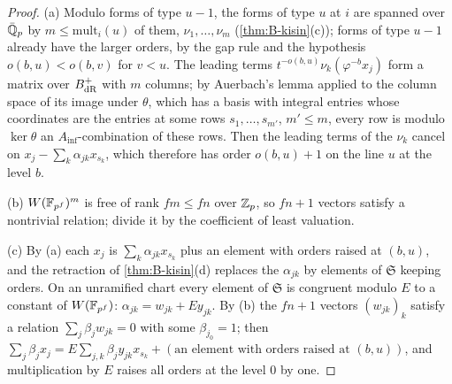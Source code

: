 \begin{proof}
(a) Modulo forms of type $u-1$, the forms of type $u$ at $i$ are spanned over $\bar{\mathbb{Q}}_p$ by $m\le\mathrm{mult}_i(u)$ of them, $\nu_1,\dots,\nu_m$ (\cref{thm:B-kisin}(c)); forms of type $u-1$ already have the larger orders, by the gap rule and the hypothesis $o(b,u)<o(b,v)$ for $v<u$. The leading terms
$t^{-o(b,u)}\nu_k(\varphi^{-b}x_j)$ form a matrix over $B_{\rm dR}^+$ with $m$ columns; by Auerbach's lemma applied to the column space of its image under $\theta$, which has a basis with integral entries whose coordinates are the entries at some rows $s_1,\dots,s_{m'}$, $m'\le m$, every row is modulo
$\ker\theta$ an $A_{\inf}$-combination of these rows. Then the leading terms of the $\nu_k$ cancel on $x_j-\sum_k\alpha_{jk}x_{s_k}$, which therefore has order $o(b,u)+1$ on the line $u$ at the level $b$.

(b) $W(\mathbb{F}_{p^f})^m$ is free of rank $fm\le fn$ over $\mathbb{Z}_p$, so $fn+1$ vectors satisfy a nontrivial relation; divide it by the coefficient of least valuation.

(c) By (a) each $x_j$ is $\sum_k\alpha_{jk}x_{s_k}$ plus an element with orders raised at $(b,u)$, and the retraction of \cref{thm:B-kisin}(d) replaces the $\alpha_{jk}$ by elements of $\mathfrak S$ keeping orders. On an unramified chart every element of $\mathfrak S$ is congruent modulo $E$ to a constant of $W(\mathbb{F}_{p^f})$:
$\alpha_{jk}=w_{jk}+Ey_{jk}$. By (b) the $fn+1$ vectors $(w_{jk})_k$ satisfy a relation $\sum_j\beta_jw_{jk}=0$ with some $\beta_{j_0}=1$; then $\sum_j\beta_jx_j=E\sum_{j,k}\beta_jy_{jk}x_{s_k}+(\text{an element with orders raised at }(b,u))$, and multiplication by $E$ raises all orders at the level
$0$ by one.
\end{proof}


